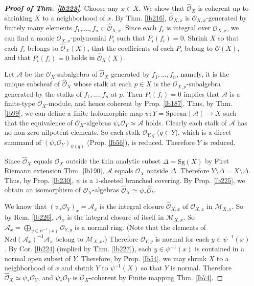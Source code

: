 \documentclass[12pt,b5paper,notitlepage]{report}
\theoremstyle{definition}
\theoremstyle{plain}
\newcommand{\scr}{\mathscr}
\newcommand{\Specan}{\mathrm{Specan}}
\newcommand{\Sg}{\mathrm{Sg}}
\newcommand{\Nzd}{\mathrm{Nzd}}
\newcommand{\Owht}{\widehat{\scr O}}
\numberwithin{equation}{section}
\begin{document}
\begin{proof}[\textbf{Proof of Thm. \ref{lb223}}]
Choose any $x\in X$. We show that $\Owht_X$ is coherent up to shrinking $X$ to a neighborhood of $x$. By Thm. \ref{lb216}, $\Owht_{X,x}$ is $\scr O_{X,x}$-generated by finitely many elements $f_1,\dots,f_n\in\Owht_{X,x}$. Since each $f_i$ is integral over $\scr O_{X,x}$, we can find a monic $\scr O_{X,x}$-polynomial $P_i$ such that $P_i(f_i)=0$. Shrink $X$ so that each $f_i$ belongs to $\Owht_X(X)$, that the coefficients of each $P_i$ belong to $\scr O(X)$, and that $P_i(f_i)=0$ holds in $\Owht_X(X)$.

Let $\scr A$ be the $\scr O_X$-subalgebra of $\Owht_X$ generated by $f_1,\dots,f_n$, namely, it is the unique subsheaf of $\Owht_X$ whose stalk at each $p\in X$ is the $\scr O_{X,p}$-subalgebra generated by the stalks of $f_1,\dots,f_n$ at $p$. Then $P_i(f_i)=0$ implies that $\scr A$ is a finite-type $\scr O_X$-module, and hence coherent by Prop. \ref{lb187}. Thus, by Thm. \ref{lb99}, we can define a finite holomorphic map $\psi:Y=\Specan(\scr A)\rightarrow X$ such that the equivalence of $\scr O_X$-algebras $\psi_*\scr O_Y\simeq \scr A$ holds. Clearly each stalk of $\scr A$ has no non-zero nilpotent elements. So each stalk $\scr O_{Y,q}$ ($q\in Y$), which is a direct summand of $(\psi_*\scr O_Y)_{\psi(q)}$ (Prop. \ref{lb56}), is reduced. Therefore $Y$ is reduced.

Since $\Owht_X$ equals $\scr O_X$ outside the thin analytic subset $\Delta=\Sg(X)$ by First Riemann extension Thm. \ref{lb190}, $\scr A$ equals $\scr O_X$ outside $\Delta$. Therefore $Y\setminus \Delta=X\setminus\Delta$. Thus, by Prop. \ref{lb230}, $\psi$ is a $1$-sheeted branched covering. By Prop. \ref{lb225}, we obtain an isomorphism of $\scr O_X$-algebras $\Owht_X\simeq\psi_*\Owht_Y$.


We know that $(\psi_*\scr O_Y)_x=\scr A_x$ is the integral closure $\Owht_{X,x}$ of $\scr O_{X,x}$ in $\scr M_{X,x}$. So by Rem. \ref{lb226}, $\scr A_x$ is the integral closure of itself in $\scr M_{X,x}$. So $\scr A_x=\bigoplus_{y\in\psi^{-1}(x)}\scr O_{Y,y}$ is a normal ring. (Note that the elements of $\Nzd(\scr A_x)^{-1}\scr A_x$ belong to $\scr M_{X,x}$.) Therefore $\scr O_{Y,y}$ is normal for each $y\in \psi^{-1}(x)$. By Cor. \ref{lb224} (implied by Thm. \ref{lb227}), each $y\in\psi^{-1}(x)$ is contained in a normal open subset of $Y$. Therefore, by Prop. \ref{lb54}, we may shrink $X$ to a neighborhood of $x$ and shrink $Y$ to $\psi^{-1}(X)$ so that $Y$ is normal. Therefore $\Owht_X\simeq\psi_*\scr O_Y$, and $\psi_*\scr O_Y$ is $\scr O_X$-coherent by Finite mapping Thm. \ref{lb74}.
\end{proof}
\end{document}
